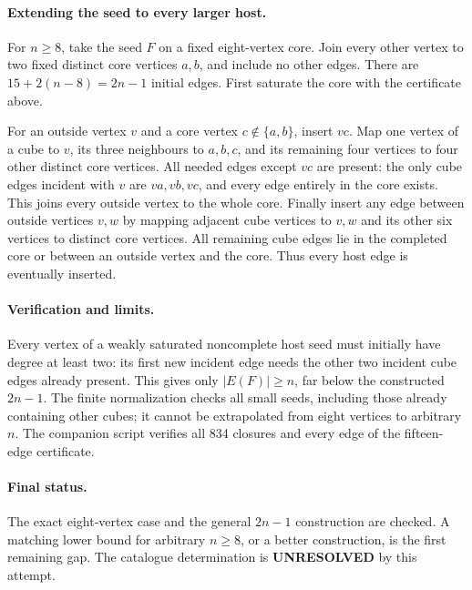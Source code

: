 \documentclass[11pt,a4paper]{article}
\begin{document}
\paragraph{Extending the seed to every larger host.}
For $n\ge8$, take the seed $F$ on a fixed eight-vertex core. Join every other vertex to two fixed distinct core vertices $a,b$, and include no other edges. There are $15+2(n-8)=2n-1$ initial edges. First saturate the core with the certificate above.

For an outside vertex $v$ and a core vertex $c\notin\{a,b\}$, insert $vc$. Map one vertex of a cube to $v$, its three neighbours to $a,b,c$, and its remaining four vertices to four other distinct core vertices. All needed edges except $vc$ are present: the only cube edges incident with $v$ are $va,vb,vc$, and every edge entirely in the core exists. This joins every outside vertex to the whole core. Finally insert any edge between outside vertices $v,w$ by mapping adjacent cube vertices to $v,w$ and its other six vertices to distinct core vertices. All remaining cube edges lie in the completed core or between an outside vertex and the core. Thus every host edge is eventually inserted.

\paragraph{Verification and limits.}
Every vertex of a weakly saturated noncomplete host seed must initially have degree at least two: its first new incident edge needs the other two incident cube edges already present. This gives only $|E(F)|\ge n$, far below the constructed $2n-1$. The finite normalization checks all small seeds, including those already containing other cubes; it cannot be extrapolated from eight vertices to arbitrary $n$. The companion script verifies all 834 closures and every edge of the fifteen-edge certificate.

\paragraph{Final status.}
The exact eight-vertex case and the general $2n-1$ construction are checked. A matching lower bound for arbitrary $n\ge8$, or a better construction, is the first remaining gap. The catalogue determination is \textbf{UNRESOLVED} by this attempt.
\end{document}
